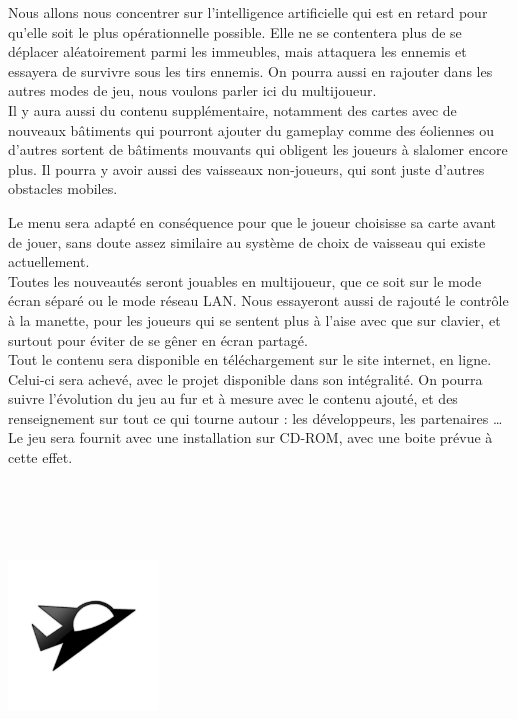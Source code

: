 \documentclass[10pt, titlepage]{report}
\begin{document}
 Nous allons nous concentrer sur l'intelligence artificielle qui est en retard pour qu'elle soit le plus opérationnelle possible. Elle ne se contentera plus de se déplacer aléatoirement parmi les immeubles, mais attaquera les ennemis et essayera de survivre sous les tirs ennemis. On pourra aussi en rajouter dans les autres modes de jeu, nous voulons parler ici du multijoueur.\\

Il y aura aussi du contenu supplémentaire, notamment des cartes avec de nouveaux bâtiments qui pourront ajouter du gameplay comme des éoliennes ou d'autres sortent de bâtiments mouvants qui obligent les joueurs à slalomer encore plus. Il pourra y avoir aussi des vaisseaux non-joueurs, qui sont juste d'autres obstacles mobiles.

Le menu sera adapté en conséquence pour que le joueur choisisse sa carte avant de jouer, sans doute assez similaire au système de choix de vaisseau qui existe actuellement.\\

Toutes les nouveautés seront jouables en multijoueur, que ce soit sur le mode écran séparé ou le mode réseau LAN. Nous essayeront aussi de rajouté le contrôle à la manette, pour les joueurs qui se sentent plus à l'aise avec que sur clavier, et surtout pour éviter de se gêner en écran partagé.\\

Tout le contenu sera disponible en téléchargement sur le site internet, en ligne. Celui-ci sera achevé, avec le projet disponible dans son intégralité. On pourra suivre l'évolution du jeu au fur et à mesure avec le contenu ajouté, et des renseignement sur tout ce qui tourne autour : les développeurs, les partenaires \dots \\

Le jeu sera fournit avec une installation sur CD-ROM, avec une boite prévue à cette effet. \\ \\ \\ \\ \\

\begin{center}
\includegraphics[height=4cm, width=4cm]{vaisseux_petit.png}
\end{center}
\end{document}
